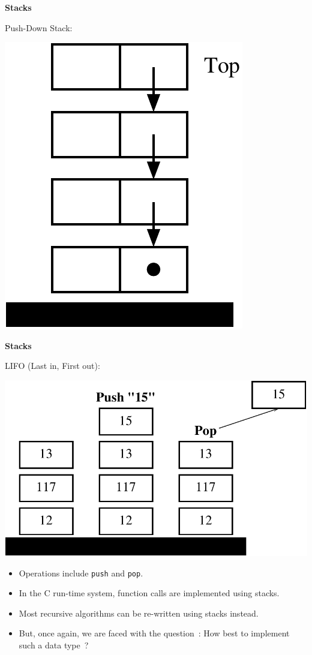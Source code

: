 \documentclass[a4,portraitt]{slides}
\begin{document}
\newpage
{\samepage
\begin{center}
{\Large{\bf Stacks}}
\end{center}
Push-Down Stack:
\begin{center}
\includegraphics[scale=1.00]{../Images/stack.pdf}
\end{center}
}

\newpage
{\samepage
\begin{center}
{\Large{\bf Stacks}}
\end{center}
LIFO (Last in, First out):
\begin{center}
\includegraphics{../Images/pdstack.pdf}
\end{center}
\begin{itemize}
\item Operations include \verb^push^ and \verb^pop^.
\item In the C run-time system, function calls are implemented using stacks.
\item Most recursive algorithms can be re-written using stacks instead.
\item But, once again, we are faced with the question~: How best to implement such a data type~?
\end{itemize}
}
\end{document}
